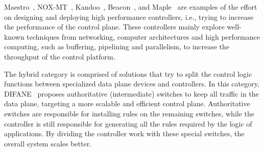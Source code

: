 %

Maestro~\cite{cai2011},
NOX-MT~\cite{tootoonchian2012},
Kandoo~\cite{yeganeh2012},
Beacon~\cite{erickson2013-1}, and
Maple~\cite{voellmy2013}
are examples of the effort on designing and deploying high performance controllers, i.e., trying to increase the performance of the control plane.
These controllers mainly explore well-known techniques from networking, computer architectures and high performance computing, such as buffering, pipelining and parallelism, to increase the throughput of the control platform.

The hybrid category is comprised of solutions that try to split the control logic functions between specialized data plane devices and controllers. 
In this category, DIFANE~\cite{yu2010-1} proposes authoritative 
(intermediate) switches to keep all traffic in the data plane, targeting a more scalable and efficient control plane. 
Authoritative switches are responsible for installing rules on the remaining switches, while the controller 
is still responsible for generating all the rules required by the logic of applications.
By dividing the controller work with these special switches, the overall system scales better.
 
